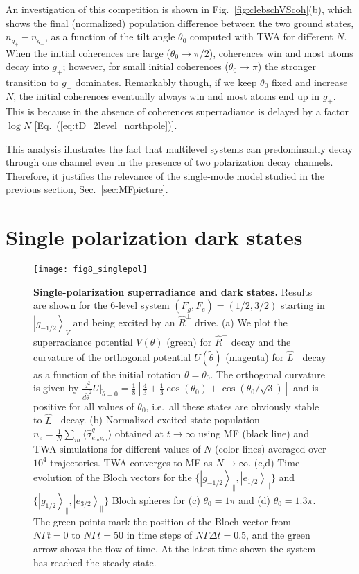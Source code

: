 \documentclass[aps,prx,superscriptaddress,twocolumn,notitlepage,nofootinbib,longbibliography]{revtex4-2}
\newcommand{\ket}[1]{\left|#1\right>}
\newcommand{\qusub}{q}
\begin{document}
An investigation of this competition is shown in Fig.~\ref{fig:clebschVScoh}(b), which shows the final (normalized) population difference between the two ground states, $n_{g_+}-n_{g_-}$, as a function of the tilt angle $\theta_0$ computed with TWA for different $N$. When the initial coherences are large ($\theta_0 \rightarrow \pi/2$), coherences win and most atoms decay into $g_+$; however, for small initial coherences ($\theta_0 \rightarrow \pi$) the stronger transition to $g_-$ dominates. Remarkably though, if we keep $\theta_0$ fixed and increase $N$, the initial coherences eventually always win and most atoms end up in $g_+$. This is because in  the absence of coherences superradiance is delayed by a factor $\log N$ [Eq.~(\ref{eq:tD_2level_northpole})].

This analysis illustrates the fact that multilevel systems can  predominantly decay through one channel even in the presence of two polarization decay channels. Therefore, it justifies the relevance of the single-mode model studied in the previous section, Sec.~\ref{sec:MFpicture}.






\section{Single polarization dark states\label{sec:singlepol_numerics}}

\begin{figure*}[!t]
\centering
\texttt{[image: fig8\_singlepol]}
\caption{\textbf{Single-polarization superradiance and dark states.} Results are shown for the 6-level system $(F_g,F_e)=(1/2,3/2)$ starting in $\ket{g_{-1/2}}_V$ and being excited by an $\hat{R}^\pm$ drive. (a) We plot the superradiance potential $V(\theta)$ (green) for $\hat{R}^-$ decay and the curvature of the orthogonal potential $U(\tilde\theta)$ (magenta) for $\hat{L}^-$ decay as a function of the initial rotation $\theta=\theta_0$. The orthogonal curvature is given by $\frac{d^2}{d\tilde\theta^2}U\big|_{\tilde\theta=0} = \frac{1}{8} [ \frac{4}{3} + \frac{1}{3} \cos(\theta_0) + \cos(\theta_0/\sqrt{3}) ]$ and is positive for all values of $\theta_0$, i.e.~all these states are obviously stable to $\hat{L}^-$ decay. (b) Normalized excited state population $n_e = \frac{1}{N} \sum_m \langle \hat{\sigma}^{\qusub}_{e_me_m}\rangle$ obtained at $t\rightarrow\infty$ using MF (black line) and TWA simulations for different values of $N$ (color lines) averaged over $10^4$ trajectories. TWA converges to MF as $N\rightarrow\infty$. (c,d) Time evolution of the Bloch vectors for the $\{\ket{g_{-1/2}}_\parallel, \ket{e_{1/2}}_\parallel\}$ and $\{\ket{g_{1/2}}_\parallel, \ket{e_{3/2}}_\parallel\}$ Bloch spheres for (c) $\theta_0=1\pi$ and (d) $\theta_0=1.3\pi$. The green points mark the position of the Bloch vector from $N\Gamma t=0$ to $N\Gamma t=50$ in time steps of $N\Gamma\Delta t=0.5$, and the green arrow shows the flow of time. At the latest time shown the system has reached the steady state.}
\label{fig:singlepol}
\end{figure*}
\end{document}
